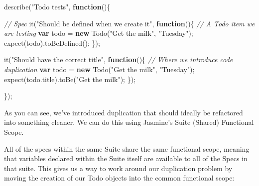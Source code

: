 \documentclass[9pt]{book}
\newenvironment{Shaded}{}{}
\newcommand{\KeywordTok}[1]{\textcolor[rgb]{0.00,0.44,0.13}{\textbf{{#1}}}}
\newcommand{\StringTok}[1]{\textcolor[rgb]{0.25,0.44,0.63}{{#1}}}
\newcommand{\CommentTok}[1]{\textcolor[rgb]{0.38,0.63,0.69}{\textit{{#1}}}}
\newcommand{\OtherTok}[1]{\textcolor[rgb]{0.00,0.44,0.13}{{#1}}}
\newcommand{\FunctionTok}[1]{\textcolor[rgb]{0.02,0.16,0.49}{{#1}}}
\newcommand{\NormalTok}[1]{{#1}}
\begin{document}
\begin{Shaded}
\begin{Highlighting}[]
\FunctionTok{describe}\NormalTok{(}\StringTok{"Todo tests"}\NormalTok{, }\KeywordTok{function}\NormalTok{()\{}
   
   \CommentTok{// Spec}
   \FunctionTok{it}\NormalTok{(}\StringTok{"Should be defined when we create it"}\NormalTok{, }\KeywordTok{function}\NormalTok{()\{}
        \CommentTok{// A Todo item we are testing}
        \KeywordTok{var} \NormalTok{todo = }\KeywordTok{new} \FunctionTok{Todo}\NormalTok{(}\StringTok{"Get the milk"}\NormalTok{, }\StringTok{"Tuesday"}\NormalTok{);}
        \FunctionTok{expect}\NormalTok{(todo).}\FunctionTok{toBeDefined}\NormalTok{();}
   \NormalTok{\}); }

   \FunctionTok{it}\NormalTok{(}\StringTok{"Should have the correct title"}\NormalTok{, }\KeywordTok{function}\NormalTok{()\{}
        \CommentTok{// Where we introduce code duplication}
        \KeywordTok{var} \NormalTok{todo = }\KeywordTok{new} \FunctionTok{Todo}\NormalTok{(}\StringTok{"Get the milk"}\NormalTok{, }\StringTok{"Tuesday"}\NormalTok{);}
        \FunctionTok{expect}\NormalTok{(}\OtherTok{todo}\NormalTok{.}\FunctionTok{title}\NormalTok{).}\FunctionTok{toBe}\NormalTok{(}\StringTok{"Get the milk"}\NormalTok{);}
   \NormalTok{\});}

\NormalTok{\});}
\end{Highlighting}
\end{Shaded}

As you can see, we've introduced duplication that should ideally be
refactored into something cleaner. We can do this using Jasmine's Suite
(Shared) Functional Scope.

All of the specs within the same Suite share the same functional scope,
meaning that variables declared within the Suite itself are available to
all of the Specs in that suite. This gives us a way to work around our
duplication problem by moving the creation of our Todo objects into the
common functional scope:
\end{document}
